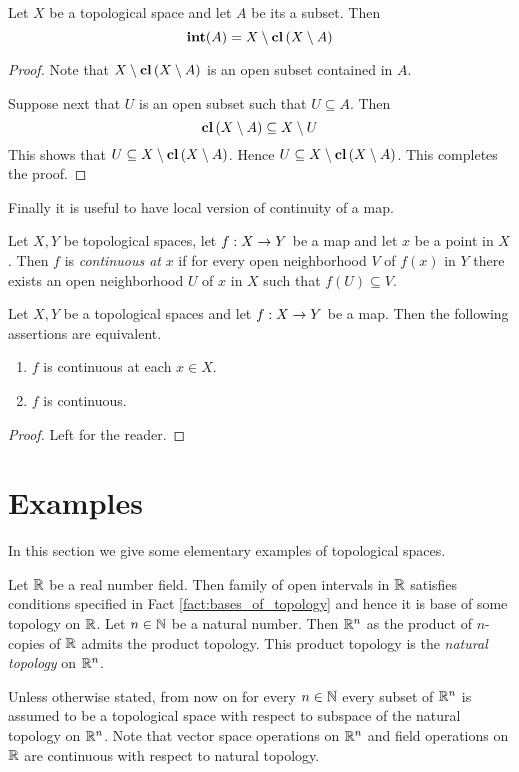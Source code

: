 \begin{fact}\label{fact:relation_between_closure_and_interior}
	Let $X$ be a topological space and let $A$ be its a subset. Then
	$$\mathbf{int}(A) = X\setminus \mathbf{cl}\left(X\setminus A\right)$$
\end{fact}
\begin{proof}
	Note that $X\setminus \mathbf{cl}\left(X\setminus A\right)$ is an open subset contained in $A$.

	Suppose next that $U$ is an open subset such that $U \subseteq A$. Then
	$$\mathbf{cl}\left(X\setminus A\right) \subseteq X\setminus U$$
	This shows that $U \subseteq X\setminus \mathbf{cl}\left(X\setminus A\right)$. Hence $U \subseteq X\setminus \mathbf{cl}\left(X\setminus A\right)$. This completes the proof.
\end{proof}
\noindent
Finally it is useful to have local version of continuity of a map.

\begin{definition}
	Let $X, Y$ be topological spaces, let $f:X\rightarrow Y$ be a map and let $x$ be a point in $X$. Then $f$ is \textit{continuous at} $x$ if for every open neighborhood $V$ of $f(x)$ in $Y$ there exists an open neighborhood $U$ of $x$ in $X$ such that $f(U) \subseteq V$.
\end{definition}

\begin{fact}\label{fact:function_continuous_at_each_point_is_continuous}
	Let $X, Y$ be a topological spaces and let $f:X\rightarrow Y$ be a map. Then the following assertions are equivalent.
	\begin{enumerate}[label=\emph{\textbf{(\roman*)}}, leftmargin=3.0em]
		\item $f$ is continuous at each $x \in X$.
		\item $f$ is continuous.
	\end{enumerate}
\end{fact}
\begin{proof}
	Left for the reader.
\end{proof}

\section{Examples}
\noindent
In this section we give some elementary examples of topological spaces.

\begin{example}\label{example:real_line_and_its_products}
	Let ${\mathbb R}$ be a real number field. Then family of open intervals in ${\mathbb R}$ satisfies conditions specified in Fact \ref{fact:bases_of_topology} and hence it is base of some topology on ${\mathbb R}$. Let $n \in {\mathbb N}$ be a natural number. Then ${\mathbb R}^n$ as the product of $n$-copies of ${\mathbb R}$ admits the product topology. This product topology is the \textit{natural topology} on ${\mathbb R}^n$.
\end{example}
\noindent
Unless otherwise stated, from now on for every $n \in {\mathbb N}$ every subset of ${\mathbb R}^n$ is assumed to be a topological space with respect to subspace of the natural topology on ${\mathbb R}^n$. Note that vector space operations on ${\mathbb R}^n$ and field operations on ${\mathbb R}$ are continuous with respect to natural topology.

